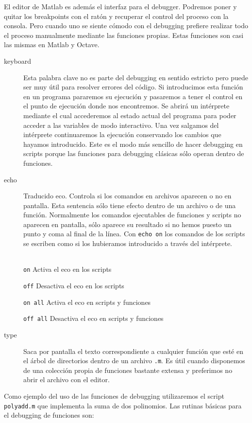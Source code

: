 El editor de Matlab es además el interfaz para el debugger. Podremos
poner y quitar los breakpoints con el ratón y recuperar el control del
proceso con la consola. Pero cuando uno se siente cómodo con el
debugging prefiere realizar todo el proceso manualmente mediante las
funciones propias. Estas funciones son casi las mismas en Matlab y
Octave.

\begin{description}
\item [keyboard]Esta palabra clave no es parte del debugging en
  sentido estricto pero puede ser muy útil para resolver errores del
  código.  Si introducimos esta función en un programa pararemos su
  ejecución y pasaremos a tener el control en el punto de ejecución
  donde nos encontremos. Se abrirá un intérprete mediante el cual
  accederemos al estado actual del programa para poder acceder a las
  variables de modo interactivo. Una vez salgamos del intérprete
  continuaremos la ejecución conservando los cambios que hayamos
  introducido. Este es el modo más sencillo de hacer debugging en
  scripts porque las funciones para debugging clásicas sólo operan
  dentro de funciones.
\item [{echo}] Traducido eco.  Controla si los comandos en
  archivos aparecen o no en pantalla. Esta sentencia sólo tiene efecto
  dentro de un archivo o de una función.  Normalmente los comandos
  ejecutables de funciones y scripts no aparecen en pantalla, sólo
  aparece su resultado si no hemos puesto un punto y coma al final de
  la línea. Con \texttt{echo on} los comandos de los scripts se
  escriben como si los hubieramos introducido a través
  del intérprete.\\
  \\
  \begin{minipage}[c]{1\linewidth}%
    \texttt{on} Activa el eco en los scripts

    \texttt{off} Desactiva el eco en los scripts

    {\texttt{on all}} Activa el eco en scripts y funciones

    {\texttt{off all}} Desactiva el eco en scripts y
    funciones\end{minipage}%

\item [type]Saca por pantalla el texto correspondiente a
  cualquier función que esté en el árbol de directorios dentro de un
  archivo \texttt{.m}.  Es útil cuando disponemos de una colección
  propia de funciones bastante extensa y preferimos no abrir el
  archivo con el editor.
\end{description}
Como ejemplo del uso de las funciones de debugging utilizaremos el
script \texttt{polyadd.m} que implementa la suma de dos polinomios.
Las rutinas básicas para el debugging de funciones son:

